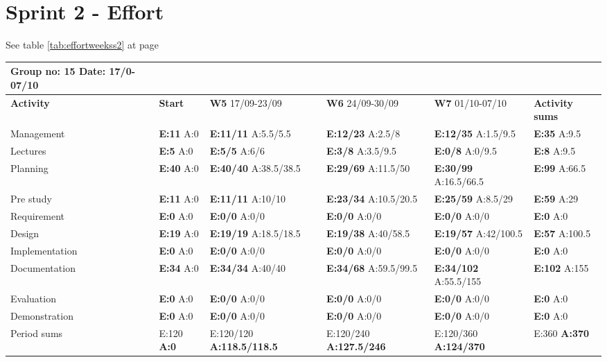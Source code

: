 \section{Sprint 2 - Effort}

See table \ref{tab:effortweekss2} at page \pageref{tab:effortweekss2}
\begin{table}
\begin{tabularx}{\linewidth}{>{\setlength\hsize{.625\hsize}}X|>{\setlength\hsize{0.3\hsize}}X|>{\setlength\hsize{0.5\hsize}}X|>{\setlength\hsize{0.5\hsize}}X|>{\setlength\hsize{0.5\hsize}}X|>{\setlength\hsize{.3\hsize}}X}
Group no: 15 Date: 17/0-07/10  \\ \hline
\textbf{Activity} & \textbf{Start} & \textbf{W5} 17/09-23/09 & \textbf{W6} 24/09-30/09 & \textbf{W7} 01/10-07/10 & \textbf{Activity sums} \\ \hline \hline
Management & \textbf{E:11} A:0 & \textbf{E:11/11} A:5.5/5.5 & \textbf{E:12/23} A:2.5/8 & \textbf{E:12/35} A:1.5/9.5 & \textbf{E:35} A:9.5  \\ \hline
Lectures & \textbf{E:5} A:0 & \textbf{E:5/5} A:6/6 & \textbf{E:3/8} A:3.5/9.5 & \textbf{E:0/8} A:0/9.5 & \textbf{E:8 } A:9.5  \\ \hline
Planning & \textbf{E:40} A:0 & \textbf{E:40/40} A:38.5/38.5 & \textbf{E:29/69} A:11.5/50 & \textbf{E:30/99} A:16.5/66.5 & \textbf{E:99 } A:66.5  \\ \hline
Pre study & \textbf{E:11} A:0 & \textbf{E:11/11} A:10/10 & \textbf{E:23/34} A:10.5/20.5 & \textbf{E:25/59} A:8.5/29 & \textbf{E:59} A:29  \\ \hline
Requirement & \textbf{E:0} A:0 & \textbf{E:0/0} A:0/0 & \textbf{E:0/0} A:0/0 & \textbf{E:0/0} A:0/0 & \textbf{E:0} A:0  \\ \hline
Design & \textbf{E:19} A:0 & \textbf{E:19/19} A:18.5/18.5 & \textbf{E:19/38} A:40/58.5 & \textbf{E:19/57} A:42/100.5 & \textbf{E:57} A:100.5  \\ \hline
Implementation & \textbf{E:0} A:0 & \textbf{E:0/0} A:0/0 & \textbf{E:0/0} A:0/0 & \textbf{E:0/0} A:0/0 & \textbf{E:0} A:0  \\ \hline
Documentation & \textbf{E:34} A:0 & \textbf{E:34/34} A:40/40 & \textbf{E:34/68} A:59.5/99.5 & \textbf{E:34/102} A:55.5/155 & \textbf{E:102 } A:155  \\ \hline
Evaluation & \textbf{E:0} A:0 & \textbf{E:0/0} A:0/0 & \textbf{E:0/0} A:0/0 & \textbf{E:0/0} A:0/0 & \textbf{E:0 } A:0  \\ \hline
Demonstration & \textbf{E:0} A:0 & \textbf{E:0/0} A:0/0 & \textbf{E:0/0} A:0/0 & \textbf{E:0/0} A:0/0 & \textbf{E:0 } A:0  \\ \hline
Period sums & E:120 \textbf{A:0} & E:120/120 \textbf{A:118.5/118.5} & E:120/240 \textbf{A:127.5/246} & E:120/360 \textbf{A:124/370} & E:360 \textbf{A:370} \\ \hline
\end{tabularx}



\end{table}
